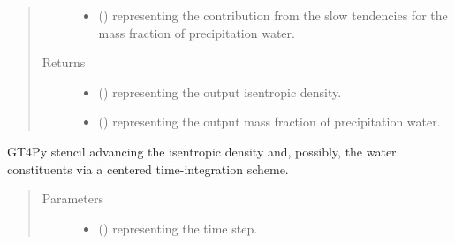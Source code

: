 \documentclass[letterpaper,10pt,english]{sphinxmanual}
\begin{document}
\begin{fulllineitems}
\begin{fulllineitems}
\begin{quote}
\begin{description}
\begin{itemize}
\item {} 
 () \textendash{}  representing the contribution from the slow tendencies for the mass fraction of
precipitation water.

\end{itemize}

\item[{Returns}] \leavevmode
\begin{itemize}
\item {} 
 () \textendash{}  representing the output isentropic density.

\item {} 
 () \textendash{}  representing the output mass fraction of precipitation water.

\end{itemize}


\end{description}\end{quote}

\end{fulllineitems}


\begin{fulllineitems}
\label{\detokenize{api:tasmania.dycore.prognostic_isentropic_nonconservative_centered.PrognosticIsentropicNonconservativeCentered._stencil_stepping_by_neglecting_vertical_advection_unstaggered_defs}}
GT4Py stencil advancing the isentropic density and, possibly, the water constituents via a centered time-integration scheme.
\begin{quote}\begin{description}
\item[{Parameters}] \leavevmode\begin{itemize}
\item {} 
 () \textendash{}  representing the time step.


\end{itemize}
\end{description}
\end{quote}
\end{fulllineitems}
\end{fulllineitems}
\end{document}
